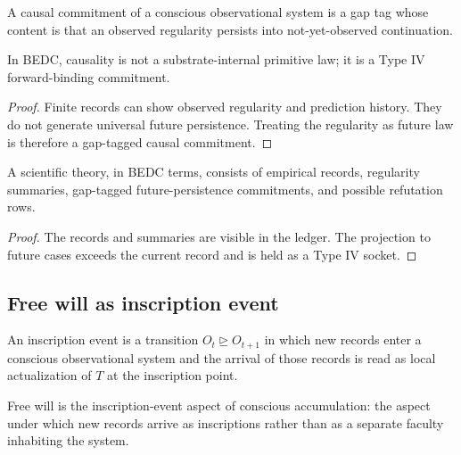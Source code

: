 \begin{definition}
\label{def:philosophy-causal-commitment}
A causal commitment of a conscious observational system is a gap tag
whose content is that an observed regularity persists into
not-yet-observed continuation.
\end{definition}

\begin{theorem}
\label{thm:philosophy-causality-not-primitive-law}
In BEDC, causality is not a substrate-internal primitive law; it is a
Type IV forward-binding commitment.
\end{theorem}
\begin{proof}
Finite records can show observed regularity and prediction history.
They do not generate universal future persistence. Treating the
regularity as future law is therefore a gap-tagged causal commitment.
\end{proof}

\begin{corollary}
\label{cor:philosophy-scientific-theories-records-gap-stack}
A scientific theory, in BEDC terms, consists of empirical records,
regularity summaries, gap-tagged future-persistence commitments, and
possible refutation rows.
\end{corollary}
\begin{proof}
The records and summaries are visible in the ledger. The projection to
future cases exceeds the current record and is held as a Type IV
socket.
\end{proof}

\subsection{Free will as inscription event}
\label{subsec:philosophy-free-will-inscription-event}

\begin{definition}
\label{def:philosophy-phenomenology-inscription-event}
An inscription event is a transition \(O_t\unrhd O_{t+1}\) in which
new records enter a conscious observational system and the arrival of
those records is read as local actualization of \(T\) at the
inscription point.
\end{definition}

\begin{definition}
\label{def:philosophy-free-will}
Free will is the inscription-event aspect of conscious accumulation:
the aspect under which new records arrive as inscriptions rather than
as a separate faculty inhabiting the system.
\end{definition}

